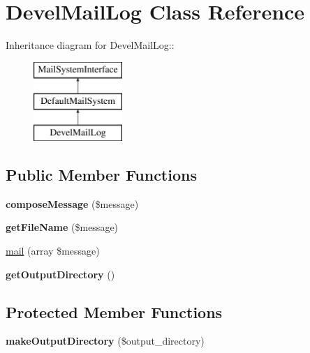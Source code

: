 \hypertarget{classDevelMailLog}{
\section{DevelMailLog Class Reference}
\label{classDevelMailLog}
}
Inheritance diagram for DevelMailLog::\begin{figure}[H]
\begin{center}
\leavevmode
\includegraphics[height=3cm]{classDevelMailLog}
\end{center}
\end{figure}
\subsection*{Public Member Functions}
\begin{DoxyCompactItemize}
\item 
\hypertarget{classDevelMailLog_a7fc38d7076f8fc369f4a9fc59acd8fb2}{
{\bfseries composeMessage} (\$message)}
\label{classDevelMailLog_a7fc38d7076f8fc369f4a9fc59acd8fb2}

\item 
\hypertarget{classDevelMailLog_ac8750ec41508031f9dee0193e814d87a}{
{\bfseries getFileName} (\$message)}
\label{classDevelMailLog_ac8750ec41508031f9dee0193e814d87a}

\item 
\hyperlink{classDevelMailLog_a1179208e4b2b37addefcc9f8ed9be0b0}{mail} (array \$message)
\item 
\hypertarget{classDevelMailLog_a9fb9e9177ca1ce0e8af9bf8ea33513df}{
{\bfseries getOutputDirectory} ()}
\label{classDevelMailLog_a9fb9e9177ca1ce0e8af9bf8ea33513df}

\end{DoxyCompactItemize}
\subsection*{Protected Member Functions}
\begin{DoxyCompactItemize}
\item 
\hypertarget{classDevelMailLog_ab1adcc72358ae5771bec2a0a2af0c008}{
{\bfseries makeOutputDirectory} (\$output\_\-directory)}
\label{classDevelMailLog_ab1adcc72358ae5771bec2a0a2af0c008}

\end{DoxyCompactItemize}


